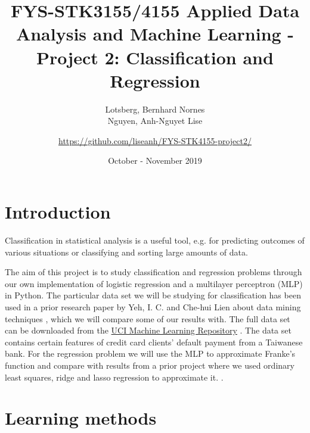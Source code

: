 \documentclass[a4paper, 11pt, twocolumn]{article}
\title{FYS-STK3155/4155 Applied Data Analysis and Machine Learning - Project 2: Classification and Regression }
\author{Lotsberg, Bernhard Nornes \\ Nguyen, Anh-Nguyet Lise \and \url{https://github.com/liseanh/FYS-STK4155-project2/}}
\date{October - November 2019}
\begin{document}

\section{Introduction}
Classification in statistical analysis is a useful tool, e.g. for predicting 
outcomes of various situations or classifying and sorting large amounts of data.

The aim of this project is  to study classification and regression problems 
through our own implementation of logistic regression and a multilayer perceptron 
(MLP) in Python. The particular data set we will be studying for classification 
has been used in a prior research paper by Yeh, I. C. and Che-hui Lien about 
data mining techniques \cite{origarticle}, which we will compare some of our 
results with.  The full data set can be downloaded from the \href{https://archive.ics.uci.edu/ml/datasets/default+of+credit+card+clients}{UCI Machine 
Learning Repository} \cite{UCI}. The data set contains certain features of 
credit card clients' default payment from a Taiwanese bank.
For the regression problem we will use the MLP to approximate Franke's function 
and compare with results from a prior project where we used ordinary least 
squares, ridge and lasso regression to approximate it. \cite{regpaper}.


\section{Learning methods}
\end{document}
